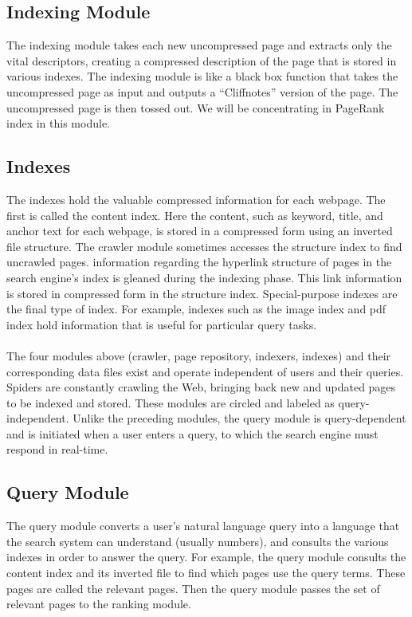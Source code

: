 \subsection{Indexing Module}
The indexing module takes each new uncompressed page and extracts only the vital descriptors, creating a compressed description of the page that is stored in various indexes. The indexing module is like a black box function that takes the uncompressed page as input and outputs a “Cliffnotes” version of the page. The uncompressed page is then tossed out. We will be concentrating in PageRank index in this module.

\subsection{Indexes}
The indexes hold the valuable compressed information for each webpage. The first is called the content index. Here the content, such as keyword, title, and anchor text for each webpage, is stored in a compressed form using an inverted file structure. The crawler module sometimes accesses the structure index to find uncrawled pages. information regarding the hyperlink structure of pages in the search engine's index is gleaned during the indexing phase. This link information is stored in compressed form in the structure index. Special-purpose indexes are the final type of index. For example, indexes such as the image index and pdf index hold information that is useful for particular query tasks.\\
\\
The four modules above (crawler, page repository, indexers, indexes) and their corresponding data files exist and operate independent of users and their queries. Spiders are constantly crawling the Web, bringing back new and updated pages to be indexed and stored. These modules are circled and labeled as query-independent. Unlike the preceding modules, the query module is query-dependent and is initiated when a user enters a query, to which the search engine must respond in real-time.

\subsection{Query Module}
The query module converts a user's natural language query into a language that the search system can understand (usually numbers), and consults the various indexes in order to answer the query. For example, the query module consults the content index and its inverted file to find which pages use the query terms. These pages are called the relevant pages. Then the query module passes the set of relevant pages to the ranking module.

